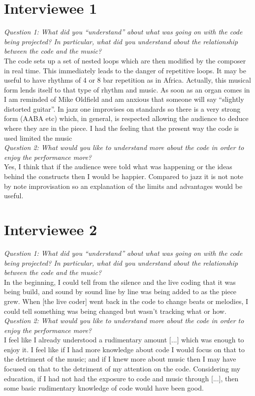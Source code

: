 
\section*{Interviewee 1}
\textit{Question 1: What did you ``understand'' about what was going on with the code being projected? In particular, what did you understand about the relationship between the code and the music?}
\\[12pt]
The code sets up a set of nested loops which are then modified by the composer in real time. This immediately leads to the danger of repetitive loops. It may be useful to have rhythms of 4 or 8 bar repetition as in Africa. Actually, this musical form lends itself to that type of rhythm and music. As soon as an organ comes in I am reminded of Mike Oldfield and am anxious that someone will say “slightly distorted guitar”. In jazz one improvises on standards so there is a very strong form (AABA etc) which, in general, is respected allowing the audience to deduce where they are in the piece. I had the feeling that the present way the code is used limited the music
\\[24pt]
\textit{Question 2: What would you like to understand more about the code in order to enjoy the performance more?}
\\[12pt]
Yes, I think that if the audience were told what was happening or the ideas behind the constructs then I would be happier. Compared to jazz it is not note by note improvisation so an explanation of the limits and advantages would be useful.

\section*{Interviewee 2}

\textit{Question 1: What did you ``understand'' about what was going on with the code being projected? In particular, what did you understand about the relationship between the code and the music?}
\\[12pt]
In the beginning, I could tell from the silence and the live coding that it was being build, and sound by sound line by line was being added to as the piece grew.  When [the live coder] went back in the code to change beats or melodies, I could tell something was being changed but wasn't tracking what or how.
\\[24pt]
\textit{Question 2: What would you like to understand more about the code in order to enjoy the performance more?}
\\[12pt]
I feel like I already understood a rudimentary amount [...] which was enough to enjoy it.  I feel like if I had more knowledge about code I would focus on that to the detriment of the music; and if I knew more about music then I may have focused on that to the detriment of my attention on the code.  Considering my education, if I had not had the exposure to code and music through [...], then some basic rudimentary knowledge of code would have been good.

